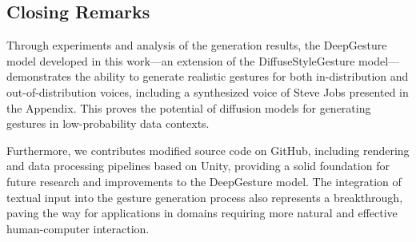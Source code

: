 %	
%	
%	
%

\subsection{Closing Remarks}

Through experiments and analysis of the generation results, the DeepGesture model developed in this work—an extension of the DiffuseStyleGesture model—demonstrates the ability to generate realistic gestures for both in-distribution and out-of-distribution voices, including a synthesized voice of Steve Jobs presented in the Appendix. This proves the potential of diffusion models for generating gestures in low-probability data contexts.

Furthermore, we contributes modified source code on GitHub, including rendering and data processing pipelines based on Unity, providing a solid foundation for future research and improvements to the DeepGesture model. The integration of textual input into the gesture generation process also represents a breakthrough, paving the way for applications in domains requiring more natural and effective human-computer interaction.